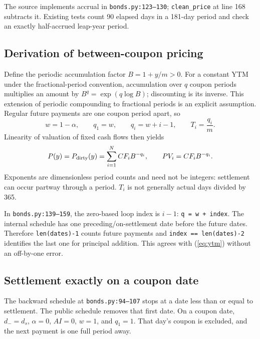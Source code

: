 \documentclass[12pt,a4paper]{article}
\begin{document}
The source implements accrual in \texttt{bonds.py:123--130};
\texttt{clean\_price} at line 168 subtracts it. Existing tests count 90
elapsed days in a 181-day period and check an exactly half-accrued leap-year
period.

\subsection{Derivation of between-coupon pricing}
Define the periodic accumulation factor $B=1+y/m>0$.
For a constant YTM under the fractional-period convention, accumulation
over $q$ coupon periods multiplies an amount by $B^q=\exp(q\log B)$;
discounting is its inverse. This extension of periodic compounding to
fractional periods is an explicit assumption.
Regular future payments are one coupon period apart, so
\begin{equation}
 w=1-\alpha,\qquad q_1=w,\qquad q_i=w+i-1,\qquad T_i=\frac{q_i}{m}.
\end{equation}
Linearity of valuation of fixed cash flows then yields
\begin{equation}\label{eq:ytm}
 P(y)=P_{\rm dirty}(y)=\sum_{i=1}^{N}CF_i B^{-q_i},
 \qquad PV_i=CF_i B^{-q_i}.
\end{equation}
Exponents are dimensionless period counts and need not be integers:
settlement can occur partway through a period. $T_i$ is not generally
actual days divided by 365.

In \texttt{bonds.py:139--159}, the zero-based loop index is $i-1$:
\texttt{q = w + index}. The internal schedule has one preceding/on-settlement
date before the future dates. Therefore \texttt{len(dates)-1} counts future
payments and \texttt{index == len(dates)-2} identifies the last one for
principal addition. This agrees with (\ref{eq:ytm}) without an off-by-one error.

\subsection{Settlement exactly on a coupon date}
The backward schedule at \texttt{bonds.py:94--107} stops at a date less
than or equal to settlement. The public schedule removes that first date.
On a coupon date, $d_-=d_s$, $\alpha=0$, $AI=0$, $w=1$, and $q_1=1$.
That day's coupon is excluded, and the next payment is one full period away.
\end{document}
